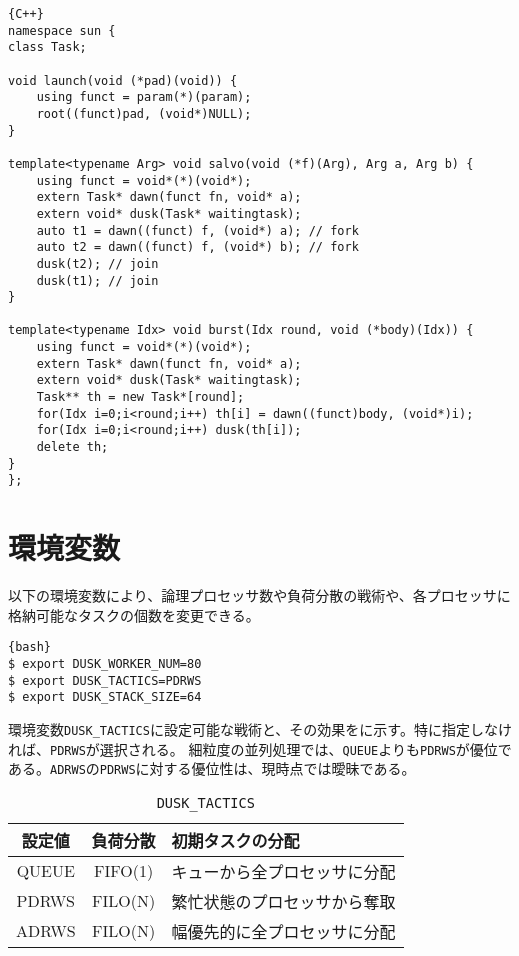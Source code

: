 \documentclass[10pt,a4paper]{book}
\begin{document}
\begin{Verbatim}{C++}
namespace sun {
class Task;

void launch(void (*pad)(void)) {
	using funct = param(*)(param);
	root((funct)pad, (void*)NULL);
}

template<typename Arg> void salvo(void (*f)(Arg), Arg a, Arg b) {
	using funct = void*(*)(void*);
	extern Task* dawn(funct fn, void* a);
	extern void* dusk(Task* waitingtask);
	auto t1 = dawn((funct) f, (void*) a); // fork
	auto t2 = dawn((funct) f, (void*) b); // fork
	dusk(t2); // join
	dusk(t1); // join
}

template<typename Idx> void burst(Idx round, void (*body)(Idx)) {
	using funct = void*(*)(void*);
	extern Task* dawn(funct fn, void* a);
	extern void* dusk(Task* waitingtask);
	Task** th = new Task*[round];
	for(Idx i=0;i<round;i++) th[i] = dawn((funct)body, (void*)i);
	for(Idx i=0;i<round;i++) dusk(th[i]);
	delete th;
}
};
\end{Verbatim}

\section{環境変数}

以下の環境変数により、論理プロセッサ数や負荷分散の戦術や、各プロセッサに格納可能なタスクの個数を変更できる。

\begin{Verbatim}{bash}
$ export DUSK_WORKER_NUM=80
$ export DUSK_TACTICS=PDRWS
$ export DUSK_STACK_SIZE=64
\end{Verbatim}

環境変数\texttt{DUSK\_TACTICS}に設定可能な戦術と、その効果をに示す。特に指定しなければ、\texttt{PDRWS}が選択される。
細粒度の並列処理では、\texttt{QUEUE}よりも\texttt{PDRWS}が優位である。\texttt{ADRWS}の\texttt{PDRWS}に対する優位性は、現時点では曖昧である。

\begin{table}[h]
\centering
\caption{\texttt{DUSK\_TACTICS}\label{tab:tactics}}
\begin{tabular}{>{\ttfamily}c>{\ttfamily}cl} \toprule
設定値 & 負荷分散 & 初期タスクの分配 \\ \midrule[.8pt]
QUEUE & FIFO(1) & キューから全プロセッサに分配 \\ \midrule
PDRWS & FILO(N) & 繁忙状態のプロセッサから奪取 \\ \midrule
ADRWS & FILO(N) & 幅優先的に全プロセッサに分配 \\ \bottomrule
\end{tabular}
\end{table}
\end{document}
